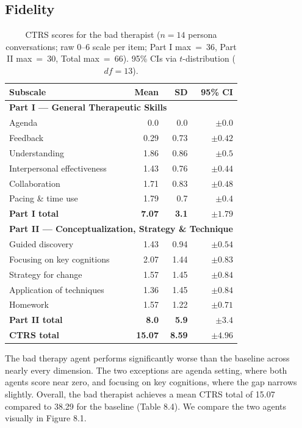 \documentclass[twoside]{report}
\begin{document}
\subsection{Fidelity}
\begin{table}[ht]
\centering
\caption{CTRS scores for the bad therapist ($n = 14$ persona conversations; raw 0--6 scale per item; Part I max~=~36, Part II max~=~30, Total max~=~66). 95\% CIs via $t$-distribution ($df = 13$).}
\label{tab:ctrs_add7e6c3}
\begin{tabular}{|l|r|r|r|}
\hline
\textbf{Subscale} & \textbf{Mean} & \textbf{SD} & \textbf{95\% CI} \\
\hline
\hline
\multicolumn{4}{|l|}{\textbf{Part I --- General Therapeutic Skills}} \\
\hline
Agenda & 0.0 & 0.0 & $\pm 0.0$ \\
\hline
Feedback & 0.29 & 0.73 & $\pm 0.42$ \\
\hline
Understanding & 1.86 & 0.86 & $\pm 0.5$ \\
\hline
Interpersonal effectiveness & 1.43 & 0.76 & $\pm 0.44$ \\
\hline
Collaboration & 1.71 & 0.83 & $\pm 0.48$ \\
\hline
Pacing \& time use & 1.79 & 0.7 & $\pm 0.4$ \\
\hline
\textbf{Part I total} & \textbf{7.07} & \textbf{3.1} & $\mathbf{\pm 1.79}$ \\
\hline
\hline
\multicolumn{4}{|l|}{\textbf{Part II --- Conceptualization, Strategy \& Technique}} \\
\hline
Guided discovery & 1.43 & 0.94 & $\pm 0.54$ \\
\hline
Focusing on key cognitions & 2.07 & 1.44 & $\pm 0.83$ \\
\hline
Strategy for change & 1.57 & 1.45 & $\pm 0.84$ \\
\hline
Application of techniques & 1.36 & 1.45 & $\pm 0.84$ \\
\hline
Homework & 1.57 & 1.22 & $\pm 0.71$ \\
\hline
\textbf{Part II total} & \textbf{8.0} & \textbf{5.9} & $\mathbf{\pm 3.4}$ \\
\hline
\hline
\textbf{CTRS total} & \textbf{15.07} & \textbf{8.59} & $\mathbf{\pm 4.96}$ \\
\hline
\end{tabular}
\end{table}
\FloatBarrier

The bad therapy agent performs significantly worse than the baseline across nearly every dimension. The two exceptions are agenda setting, where both agents score near zero, and focusing on key cognitions, where the gap narrows slightly. Overall, the bad therapist achieves a mean CTRS total of 15.07 compared to 38.29 for the baseline (Table 8.4). We compare the two agents visually in Figure 8.1.
\end{document}
